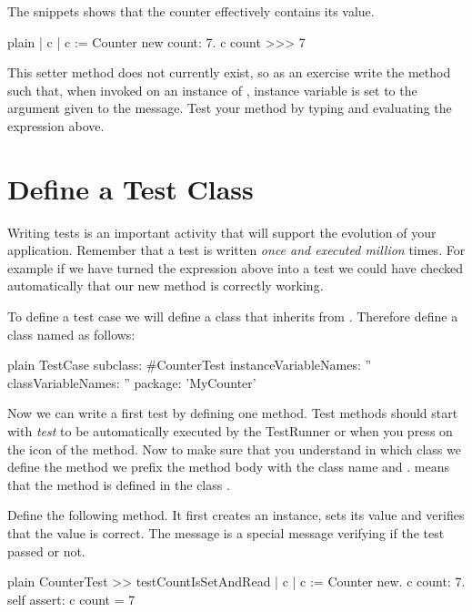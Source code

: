 \documentclass[10pt,twoside,english]{_support/latex/sbabook/sbabook}
\begin{document}
The snippets shows that the counter effectively contains its value.

\begin{displaycode}{plain}
| c |
c := Counter new count: 7.
c count
>>> 7
\end{displaycode}

This setter method does not currently exist, so as an exercise write the method  such that, when invoked on an instance of ,  instance variable is set to the argument given to the message. Test your method by typing and evaluating the expression above.
\section{Define a Test Class}
Writing tests is an important activity that will support the evolution of your application. Remember that a test is written \textit{once and executed million} times. For example if we have turned the expression above into a test we could have checked automatically that our new method is correctly working. 

To define a test case we will define a class that inherits from . Therefore define a class named  as follows:

\begin{displaycode}{plain}
TestCase subclass: #CounterTest
   instanceVariableNames: ''
   classVariableNames: ''
   package: 'MyCounter'
\end{displaycode}

Now we can write a first test by defining one method. Test methods should start with \textit{test} to be automatically executed by the TestRunner or when you press on the icon of the method. Now to make sure that you understand in which class we define the method we prefix the method body with the class name and \textcode{\textgreater{}\textgreater{}}.
 means that the method is defined in the class .

Define the following method. It first creates an instance, sets its value and verifies that the value is correct. The message  is a special message verifying if the test passed or not.

\begin{displaycode}{plain}
CounterTest >> testCountIsSetAndRead
   | c |
   c := Counter new.
   c count: 7.
   self assert: c count = 7
\end{displaycode}
\end{document}
